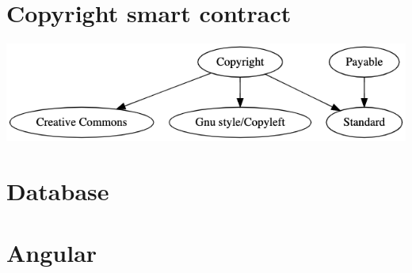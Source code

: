 \documentclass[12pt]{article}
\begin{document}
	\section{Copyright smart contract}
	
	\includegraphics[scale=0.5]{sc.png}
	
	\section{Database}
	
	\section{Angular}
	
\end{document}
